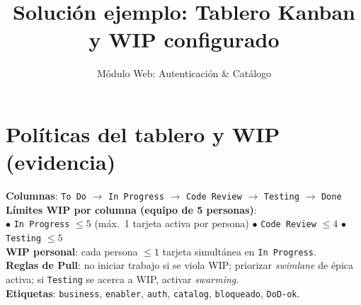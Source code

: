 \documentclass[11pt]{article}
\title{Solución ejemplo: Tablero Kanban y WIP configurado}
\author{Módulo Web: Autenticación \& Catálogo}
\date{}
\begin{document}
\maketitle

\section*{Políticas del tablero y WIP (evidencia)}
\begin{tcolorbox}
\textbf{Columnas}: \texttt{To Do} \(\rightarrow\) \texttt{In Progress} \(\rightarrow\) \texttt{Code Review} \(\rightarrow\) \texttt{Testing} \(\rightarrow\) \texttt{Done}\\
\textbf{Límites WIP por columna (equipo de 5 personas)}:\\
\(\bullet\) \texttt{In Progress} \(\leq 5\) (máx.\ 1 tarjeta activa por persona) \quad
\(\bullet\) \texttt{Code Review} \(\leq 4\) \quad
\(\bullet\) \texttt{Testing} \(\leq 5\)\\
\textbf{WIP personal}: cada persona \(\leq 1\) tarjeta simultánea en \texttt{In Progress}.\\
\textbf{Reglas de Pull}: no iniciar trabajo si se viola WIP; priorizar \emph{swimlane} de épica activa; si \texttt{Testing} se acerca a WIP, activar \emph{swarming}.\\
\textbf{Etiquetas}: \texttt{business}, \texttt{enabler}, \texttt{auth}, \texttt{catalog}, \texttt{bloqueado}, \texttt{DoD-ok}.
\end{tcolorbox}
\end{document}
